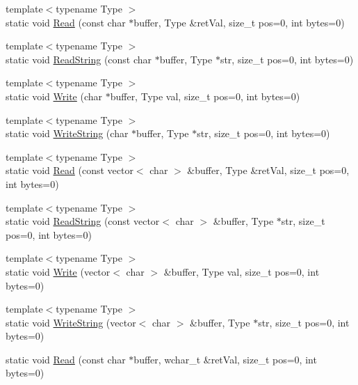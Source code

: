 \begin{DoxyCompactItemize}
{\footnotesize template$<$typename Type $>$ }\\static void \hyperlink{struct_y_compound_files_1_1_little_endian_aa1abbafbc2ae88773a9de5fdedc2951d}{Read} (const char $\ast$buffer, Type \&ret\+Val, size\+\_\+t pos=0, int bytes=0)
\item 
{\footnotesize template$<$typename Type $>$ }\\static void \hyperlink{struct_y_compound_files_1_1_little_endian_a70f369d37063b9992e94775a44b1c6ec}{Read\+String} (const char $\ast$buffer, Type $\ast$str, size\+\_\+t pos=0, int bytes=0)
\item 
{\footnotesize template$<$typename Type $>$ }\\static void \hyperlink{struct_y_compound_files_1_1_little_endian_a26c8ed75679d9e99a3f35115d9eceba2}{Write} (char $\ast$buffer, Type val, size\+\_\+t pos=0, int bytes=0)
\item 
{\footnotesize template$<$typename Type $>$ }\\static void \hyperlink{struct_y_compound_files_1_1_little_endian_a8fe264d85ae6bf400759c42e41aba0e9}{Write\+String} (char $\ast$buffer, Type $\ast$str, size\+\_\+t pos=0, int bytes=0)
\item 
{\footnotesize template$<$typename Type $>$ }\\static void \hyperlink{struct_y_compound_files_1_1_little_endian_a5ff3ff2d62117353c9f387d5d79c209e}{Read} (const vector$<$ char $>$ \&buffer, Type \&ret\+Val, size\+\_\+t pos=0, int bytes=0)
\item 
{\footnotesize template$<$typename Type $>$ }\\static void \hyperlink{struct_y_compound_files_1_1_little_endian_a346a196e2b55c4fa56272db27aba1c0c}{Read\+String} (const vector$<$ char $>$ \&buffer, Type $\ast$str, size\+\_\+t pos=0, int bytes=0)
\item 
{\footnotesize template$<$typename Type $>$ }\\static void \hyperlink{struct_y_compound_files_1_1_little_endian_a634ee9ee9122d1c2765f5e7edec3e316}{Write} (vector$<$ char $>$ \&buffer, Type val, size\+\_\+t pos=0, int bytes=0)
\item 
{\footnotesize template$<$typename Type $>$ }\\static void \hyperlink{struct_y_compound_files_1_1_little_endian_aa36071426512c3c8b9f915a3c464765c}{Write\+String} (vector$<$ char $>$ \&buffer, Type $\ast$str, size\+\_\+t pos=0, int bytes=0)
\item 
static void \hyperlink{struct_y_compound_files_1_1_little_endian_af8bb36347209e695f2583287fd90bd1d}{Read} (const char $\ast$buffer, wchar\+\_\+t \&ret\+Val, size\+\_\+t pos=0, int bytes=0)

\end{DoxyCompactItemize}
